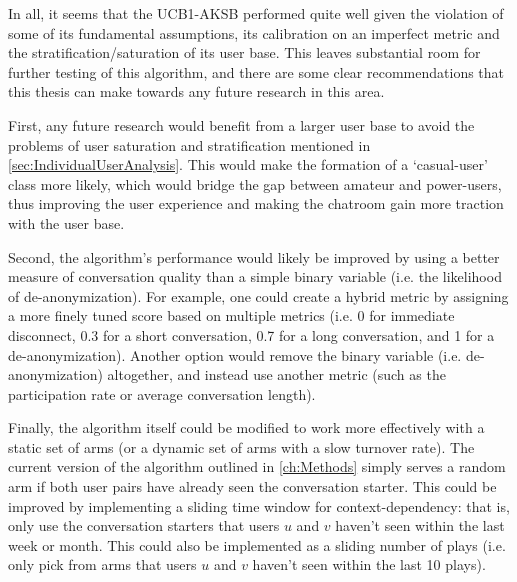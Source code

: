 In all, it seems that the UCB1-AKSB performed quite well given the violation of some of its fundamental assumptions, its calibration on an imperfect metric and the stratification/saturation of its user base. This leaves substantial room for further testing of this algorithm, and there are some clear recommendations that this thesis can make towards any future research in this area. 

First, any future research would benefit from a larger user base to avoid the problems of user saturation and stratification mentioned in \autoref{sec:IndividualUserAnalysis}. This would make the formation of a `casual-user' class more likely, which would bridge the gap between amateur and power-users, thus improving the user experience and making the chatroom gain more traction with the user base.

Second, the algorithm's performance would likely be improved by using a better measure of conversation quality than a simple binary variable (i.e. the likelihood of de-anonymization). For example, one could create a hybrid metric by assigning a more finely tuned score based on multiple metrics (i.e. 0 for immediate disconnect, 0.3 for a short conversation, 0.7 for a long conversation, and 1 for a de-anonymization). Another option would remove the binary variable (i.e. de-anonymization) altogether, and instead use another metric (such as the participation rate or average conversation length). 

Finally, the algorithm itself could be modified to work more effectively with a static set of arms (or a dynamic set of arms with a slow turnover rate). The current version of the algorithm outlined in \autoref{ch:Methods} simply serves a random arm if both user pairs have already seen the conversation starter. This could be improved by implementing a sliding time window for context-dependency: that is, only use the conversation starters that users $u$ and $v$ haven't seen within the last week or month. This could also be implemented as a sliding number of plays (i.e. only pick from arms that users $u$ and $v$ haven't seen within the last 10 plays).

